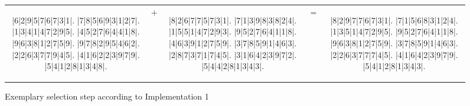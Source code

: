 \begin{figure}[H]
  \centering
  {\setlength{\tabcolsep}{-9pt}
  \renewcommand{\arraystretch}{1.5}
   \begin{tabular}{c c c c c}
    \begin{adjustbox}{width=0.38\textwidth,valign=c}
      \begin{minipage}{\linewidth}
        \begin{sudoku}
        |6|2|9|5|7|6|7|3|1|.
        |7|8|5|6|9|3|1|2|7|.
        |1|3|4|1|4|7|2|9|5|.
        |4|5|2|7|6|4|4|1|8|.
        |9|6|3|8|1|2|7|5|9|.
        |9|7|8|2|9|5|4|6|2|.
        |2|2|6|3|7|7|9|4|5|.
        |4|1|6|2|2|3|9|7|9|.
        |5|4|1|2|8|1|3|4|8|.
        \end{sudoku}
      \end{minipage}
    \end{adjustbox}
    & %
    {\begin{adjustbox}{valign=c}\Large$+$\end{adjustbox}}
    &
    \begin{adjustbox}{width=0.38\textwidth,valign=c}
      \begin{minipage}{\linewidth}
        \begin{sudoku}
        |8|2|6|7|7|5|7|3|1|.
        |7|1|3|9|8|3|8|2|4|.
        |1|5|5|1|4|7|2|9|3|.
        |9|5|2|7|6|4|1|1|8|.
        |4|6|3|9|1|2|7|5|9|.
        |3|7|8|5|9|1|4|6|3|.
        |2|8|7|3|7|1|7|4|5|.
        |3|1|6|4|2|3|9|7|2|.
        |5|4|4|2|8|1|3|4|3|.
        \end{sudoku}
      \end{minipage}
    \end{adjustbox}
    & %
    {\begin{adjustbox}{valign=c}\Large$=$\end{adjustbox}}
    &
    \begin{adjustbox}{width=0.38\textwidth,valign=c}
      \begin{minipage}{\linewidth}
        \begin{sudoku}
        |8|2|9|7|7|6|7|3|1|.
        |7|1|5|6|8|3|1|2|4|.
        |1|3|5|1|4|7|2|9|5|.
        |9|5|2|7|6|4|1|1|8|.
        |9|6|3|8|1|2|7|5|9|.
        |3|7|8|5|9|1|4|6|3|.
        |2|2|6|3|7|7|7|4|5|.
        |4|1|6|4|2|3|9|7|9|.
        |5|4|1|2|8|1|3|4|3|.
        \end{sudoku}
      \end{minipage}
    \end{adjustbox}
   \end{tabular}
  }
  \caption{Exemplary selection step according to Implementation 1}
  \label{fig:impl-1-selection}
\end{figure}

